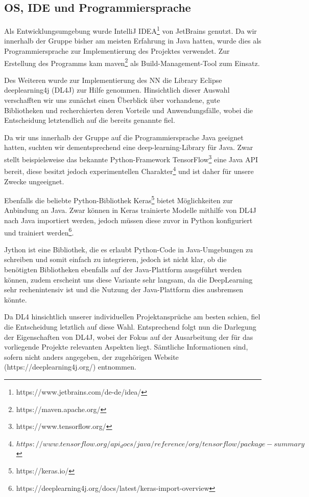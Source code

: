 \documentclass[12pt,a4paper]{article}
\begin{document}
\subsection{OS, IDE und Programmiersprache}
Als Entwicklungsumgebung wurde IntelliJ IDEA\footnote{https://www.jetbrains.com/de-de/idea/} von JetBrains genutzt. Da wir innerhalb der Gruppe bisher am meisten Erfahrung in Java hatten, wurde dies als Programmiersprache zur Implementierung des Projektes verwendet. Zur Erstellung des Programms kam maven\footnote{https://maven.apache.org/} als Build-Management-Tool zum Einsatz.

Des Weiteren wurde zur Implementierung des NN die Library Eclipse deeplearning4j (DL4J) \cite{DL4J} zur Hilfe genommen. Hinsichtlich dieser Auswahl verschafften wir uns zunächst einen Überblick über vorhandene, gute Bibliotheken und recherchierten deren Vorteile und Anwendungsfälle, wobei die Entscheidung letztendlich auf die bereits genannte fiel.

Da wir uns innerhalb der Gruppe auf die Programmiersprache Java geeignet hatten, suchten wir dementsprechend eine deep-learning-Library für Java. Zwar stellt beispielsweise das bekannte Python-Framework TensorFlow\footnote{https://www.tensorflow.org/} eine Java API bereit, diese besitzt jedoch experimentellen Charakter\footnote{$https://www.tensorflow.org/api_docs/java/reference/org/tensorflow/package-summary$} und ist daher für unsere Zwecke ungeeignet. 

Ebenfalls die beliebte Python-Bibliothek Keras\footnote{https://keras.io/} bietet Möglichkeiten zur Anbindung an Java. Zwar können in Keras trainierte Modelle mithilfe von DL4J nach Java importiert werden, jedoch müssen diese zuvor in Python konfiguriert und trainiert werden\footnote{https://deeplearning4j.org/docs/latest/keras-import-overview}.

Jython ist eine Bibliothek, die es erlaubt Python-Code in Java-Umgebungen zu schreiben und somit einfach zu integrieren, jedoch ist nicht klar, ob die benötigten Bibliotheken ebenfalls auf der Java-Plattform ausgeführt werden können, zudem erscheint uns diese Variante sehr langsam, da die DeepLearning sehr rechenintensiv ist und die Nutzung der Java-Plattform dies ausbremsen könnte.

Da DL4 hinsichtlich unserer individuellen Projektansprüche am besten schien, fiel die Entscheidung letztlich auf diese Wahl. Entsprechend folgt nun die Darlegung der Eigenschaften von DL4J, wobei der Fokus auf der Ausarbeitung der für das vorliegende Projekte relevanten Aspekten liegt. Sämtliche Informationen sind, sofern nicht anders angegeben, der zugehörigen Website (https://deeplearning4j.org/) entnommen.
\end{document}
